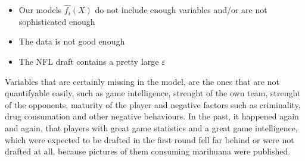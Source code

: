 \documentclass[]{article}
\providecommand{\tightlist}{%
  \setlength{\itemsep}{0pt}\setlength{\parskip}{0pt}}
\begin{document}
\begin{itemize}
\tightlist
\item
  Our models \(\hat{f_i}(X)\) do not include enough variables and/or are
  not sophisticated enough
\item
  The data is not good enough
\item
  The NFL draft contains a pretty large \(\varepsilon\)
\end{itemize}

Variables that are certainly missing in the model, are the ones that are
not quantifyable easily, such as game intelligence, strenght of the own
team, strenght of the opponents, maturity of the player and negative
factors such as criminality, drug consumation and other negative
behaviours. In the past, it happened again and again, that players with
great game statistics and a great game intelligence, which were expected
to be drafted in the first round fell far behind or were not drafted at
all, because pictures of them consuming marihuana were published.
\end{document}
